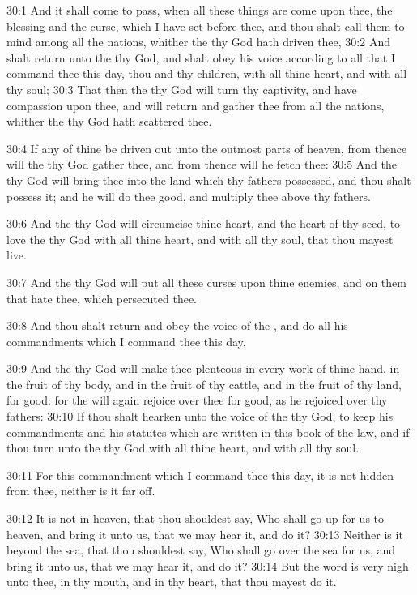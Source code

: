 30:1 And it shall come to pass, when all these things are come upon
thee, the blessing and the curse, which I have set before thee, and
thou shalt call them to mind among all the nations, whither the \LORD
thy God hath driven thee, 30:2 And shalt return unto the \LORD thy God,
and shalt obey his voice according to all that I command thee this
day, thou and thy children, with all thine heart, and with all thy
soul; 30:3 That then the \LORD thy God will turn thy captivity, and
have compassion upon thee, and will return and gather thee from all
the nations, whither the \LORD thy God hath scattered thee.

30:4 If any of thine be driven out unto the outmost parts of heaven,
from thence will the \LORD thy God gather thee, and from thence will he
fetch thee: 30:5 And the \LORD thy God will bring thee into the land
which thy fathers possessed, and thou shalt possess it; and he will do
thee good, and multiply thee above thy fathers.

30:6 And the \LORD thy God will circumcise thine heart, and the heart
of thy seed, to love the \LORD thy God with all thine heart, and with
all thy soul, that thou mayest live.

30:7 And the \LORD thy God will put all these curses upon thine
enemies, and on them that hate thee, which persecuted thee.

30:8 And thou shalt return and obey the voice of the \LORD, and do all
his commandments which I command thee this day.

30:9 And the \LORD thy God will make thee plenteous in every work of
thine hand, in the fruit of thy body, and in the fruit of thy cattle,
and in the fruit of thy land, for good: for the \LORD will again
rejoice over thee for good, as he rejoiced over thy fathers: 30:10 If
thou shalt hearken unto the voice of the \LORD thy God, to keep his
commandments and his statutes which are written in this book of the
law, and if thou turn unto the \LORD thy God with all thine heart, and
with all thy soul.

30:11 For this commandment which I command thee this day, it is not
hidden from thee, neither is it far off.

30:12 It is not in heaven, that thou shouldest say, Who shall go up
for us to heaven, and bring it unto us, that we may hear it, and do
it?  30:13 Neither is it beyond the sea, that thou shouldest say, Who
shall go over the sea for us, and bring it unto us, that we may hear
it, and do it?  30:14 But the word is very nigh unto thee, in thy
mouth, and in thy heart, that thou mayest do it.

